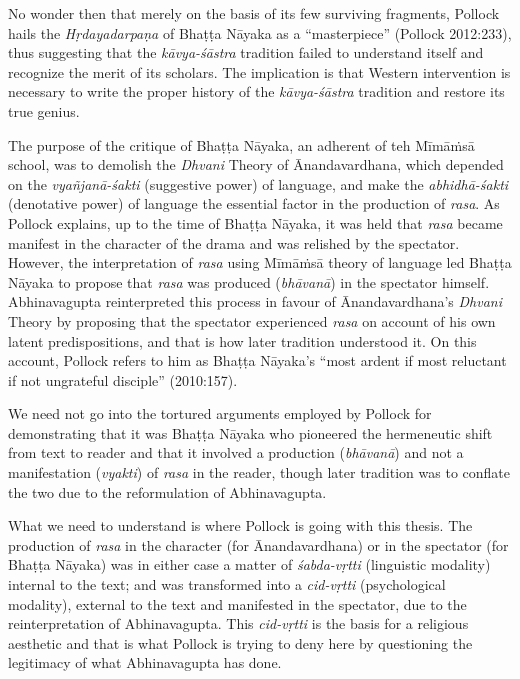 No wonder then that merely on the basis of its few surviving fragments, Pollock hails the \textsl{Hṛdayadarpaṇa} of Bhaṭṭa Nāyaka as a ``masterpiece'' (Pollock 2012:233), thus suggesting that the \textsl{kāvya-śāstra} tradition failed to understand itself and recognize the merit of its scholars. The implication is that Western intervention is necessary to write the proper history of the \textsl{kāvya-śāstra} tradition and restore its true genius.

The purpose of the critique of Bhaṭṭa Nāyaka, an adherent of teh Mīmāṁsā school, was to demolish the \textsl{Dhvani} Theory of Ānandavardhana, which depended on the \textsl{vyañjanā-śakti} (suggestive power) of language, and make the \textsl{abhidhā-śakti} (denotative power) of language the essential factor in the production of \textsl{rasa}. As Pollock explains, up to the time of Bhaṭṭa Nāyaka, it was held that \textsl{rasa} became manifest in the character of the drama and was relished by the spectator. However, the interpretation of \textsl{rasa} using Mīmāṁsā theory of language led Bhaṭṭa Nāyaka to propose that \textsl{rasa} was produced (\textsl{bhāvanā}) in the spectator himself. Abhinavagupta reinterpreted this process in favour of Ānandavardhana's
 \textsl{Dhvani} Theory by proposing that the spectator experienced \textsl{rasa} on account of his own latent predispositions, and that is how later tradition understood it. On this account, Pollock refers to him as Bhaṭṭa Nāyaka's ``most ardent if most reluctant if not ungrateful disciple'' (2010:157). 
 
We need not go into the tortured arguments employed by Pollock for demonstrating that it was Bhaṭṭa Nāyaka who pioneered the hermeneutic shift from text to reader and that it involved a production (\textsl{bhāvanā}) and not a manifestation (\textsl{vyakti}) of \textsl{rasa} in the reader, though later tradition was to conflate the two due to the reformulation of Abhinavagupta. 
 
What we need to understand is where Pollock is going with this thesis. The production of \textsl{rasa} in the character (for Ānandavardhana) or in the spectator (for Bhaṭṭa Nāyaka) was in either case a matter of \textsl{śabda-vṛtti} (linguistic modality) internal to the text; and was transformed into a \textsl{cid-vṛtti} (psychological modality), external to the text and manifested in the spectator, due to the reinterpretation of Abhinavagupta. This \textsl{cid-vṛtti} is the basis for a religious aesthetic and that is what Pollock is trying to deny here by questioning the legitimacy of what Abhinavagupta has done. 
 

